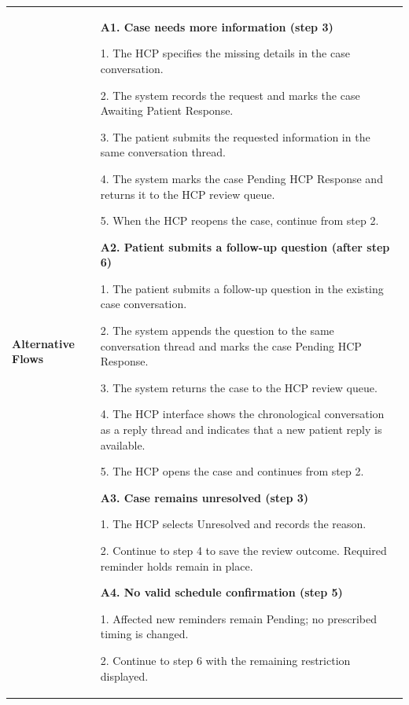 \begin{longtable}{|p{}|p{}|}
\hline
\textbf{Alternative Flows} &

\textbf{A1. Case needs more information (step 3)}\par
1. The HCP specifies the missing details in the case conversation.\par
2. The system records the request and marks the case Awaiting Patient Response.\par
3. The patient submits the requested information in the same conversation thread.\par
4. The system marks the case Pending HCP Response and returns it to the HCP review queue.\par
5. When the HCP reopens the case, continue from step 2.

\par

\textbf{A2. Patient submits a follow-up question (after step 6)}\par
1. The patient submits a follow-up question in the existing case conversation.\par
2. The system appends the question to the same conversation thread and marks the case Pending HCP Response.\par
3. The system returns the case to the HCP review queue.\par
4. The HCP interface shows the chronological conversation as a reply thread and indicates that a new patient reply is available.\par
5. The HCP opens the case and continues from step 2.

\par

\textbf{A3. Case remains unresolved (step 3)}\par
1. The HCP selects Unresolved and records the reason.\par
2. Continue to step 4 to save the review outcome. Required reminder holds remain in place.

\par

\textbf{A4. No valid schedule confirmation (step 5)}\par
1. Affected new reminders remain Pending; no prescribed timing is changed.\par
2. Continue to step 6 with the remaining restriction displayed.

\par


\end{longtable}
